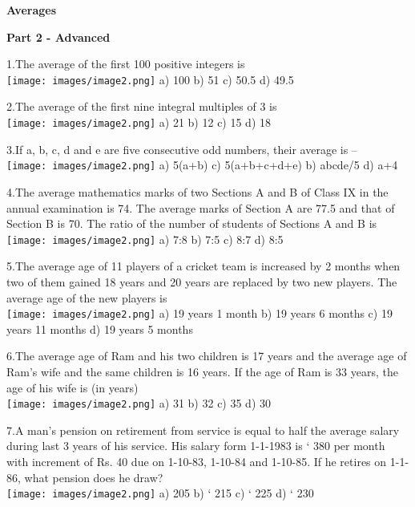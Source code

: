 \documentclass[
]{article}
\author{}
\date{}
\begin{document}
\begin{center}
	{\Large \textbf{Averages \\}}
\end{center}
{\large \textbf{Part 2 - Advanced \\}}

1.The average of the first 100 positive integers is   \\
\texttt{[image: images/image2.png]}   a) 100 	b) 51 	c) 50.5 	d) 49.5

2.The average of the first nine integral multiples of 3 is   \\
\texttt{[image: images/image2.png]}   a) 21 	b) 12 	c) 15 	d) 18

3.If a, b, c, d and e are five consecutive odd numbers, their average is –   \\
\texttt{[image: images/image2.png]}   a) 5(a+b) 	c) 5(a+b+c+d+e) b) abcde/5 d) a+4

4.The average mathematics marks of two Sections A and B of Class IX in the annual examination is 74. The average marks of Section A are 77.5 and that of Section B is 70. The ratio of the number of students of Sections A and B is   \\
\texttt{[image: images/image2.png]}   a) 7:8 	b) 7:5 	c) 8:7 	d) 8:5

5.The average age of 11 players of a cricket team is increased by 2 months when two of them gained 18 years and 20 years are replaced by two new players. The average age of the new players is   \\
\texttt{[image: images/image2.png]}   a) 19 years 1 month b) 19 years 6 months c) 19 years 11 months d) 19 years 5 months 

6.The average age of Ram and his two children is 17 years and the average age of Ram’s wife and the same children is 16 years. If the age of Ram is 33 years, the age of his wife is (in years)   \\
\texttt{[image: images/image2.png]}   a) 31 	b) 32 	c) 35 	d) 30
 	
7.A man’s pension on retirement from service is equal to half the average salary during last 3 years of his service. His salary form 1-1-1983 is ` 380 per month with increment of Rs. 40 due on 1-10-83, 1-10-84 and 1-10-85. If he retires on 1-1-86, what pension does he draw?   \\
\texttt{[image: images/image2.png]}   a) 205 	b) ` 215 	c) ` 225 	d) ` 230
\end{document}
